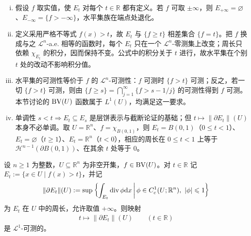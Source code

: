 \documentclass[../../main.tex]{subfiles}%
\begin{document}
\begin{remark}\label{remark:ch05-def-5-9-条件}
\begin{enumerate}[(i)]
\item 假设 $f$ 取实值，使 $E_t$ 对每个 $t\in\mathbb{R}$ 都有定义。若 $f$ 可取 $\pm\infty$，则 $E_{+\infty}=\varnothing$、$E_{-\infty}=\{f>-\infty\}$，水平集族在端点处退化。
\item 定义采用严格不等式 $f(x)>t$，故 $E_t$ 与 $\{f\geqslant t\}$ 相差集合 $\{f=t\}$。把 $f$ 换成与之 $\mathcal{L}^n$-a.e. 相等的函数时，每个 $E_t$ 只在一个 $\mathcal{L}^n$-零测集上改变；周长只依赖 $\chi_{E_t}$ 的积分，因而保持不变。公式中的积分关于 $t$ 进行，故水平集在个别 $t$ 处的改动不影响积分值。
\item 水平集的可测性等价于 $f$ 的 $\mathcal{L}^n$-可测性：$f$ 可测时 $\{f>t\}$ 可测；反之，若一切 $\{f>t\}$ 可测，则由 $\{f\geqslant s\}=\bigcap_{j=1}^{\infty}\{f>s-1/j\}$ 的可测性得到 $f$ 可测。本节讨论的 $\mathrm{BV}(U)$ 函数属于 $L^1(U)$，均满足这一要求。
\item 单调性 $s<t\Rightarrow E_t\subseteq E_s$ 是层饼表示与截断论证的基础；但 $t\mapsto\lVert\partial E_t\rVert(U)$ 本身不必单调。取 $U=\mathbb{R}^n$、$f=\chi_{B(0,1)}$，则 $E_t=B(0,1)$（$0\leqslant t<1$）、$E_t=\varnothing$（$t\geqslant1$）、$E_t=\mathbb{R}^n$（$t<0$），相应的周长在 $0\leqslant t<1$ 上等于 $\mathcal{H}^{n-1}(\partial B(0,1))$、在其余 $t$ 处等于 $0$。
\end{enumerate}
\end{remark}

\begin{lemma}[水平集周长的可测性]\label{lemma:ch05-5-1}
设 $n\geqslant1$ 为整数，$U\subseteq\mathbb{R}^n$ 为非空开集，$f\in\mathrm{BV}(U)$。对 $t\in\mathbb{R}$ 记 $E_t:=\{x\in U\mid f(x)>t\}$，并记
\begin{align*}
\lVert\partial E_t\rVert(U):=\sup\left\{\int_{E_t}\diver\phi\diff x\,\middle|\,\phi\in C_c^1(U;\mathbb{R}^n),\ \lvert\phi\rvert\leqslant1\right\}
\end{align*}
为 $E_t$ 在 $U$ 中的周长，允许取值 $+\infty$。则映射
\begin{align*}
t\mapsto\lVert\partial E_t\rVert(U)\qquad(t\in\mathbb{R})
\end{align*}
是 $\mathcal{L}^1$-可测的。
\end{lemma}
\end{document}

